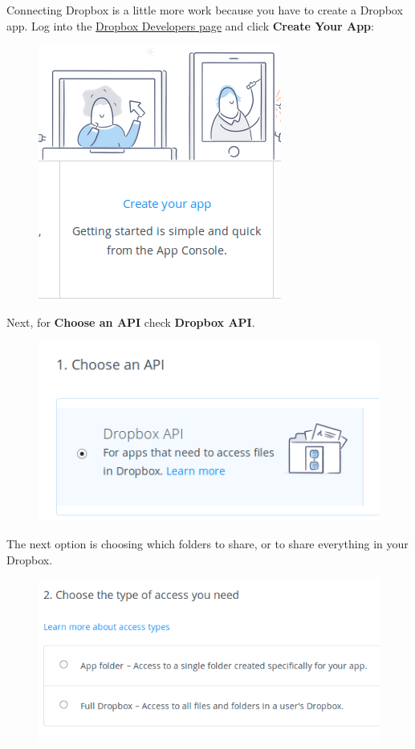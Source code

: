 \documentclass[letterpaper,10pt,english]{sphinxmanual}
\begin{document}
Connecting Dropbox is a little more work because you have to create a Dropbox
app. Log into the \href{http://www.dropbox.com/developers}{Dropbox Developers page}
and click \textbf{Create Your App}:
\begin{figure}[htbp]
\centering

\includegraphics{dropbox.png}
\end{figure}

Next, for \textbf{Choose an API} check \textbf{Dropbox API}.
\begin{figure}[htbp]
\centering

\includegraphics{dropbox-1.png}
\end{figure}

The next option is choosing which folders to share, or to share everything in
your Dropbox.
\begin{figure}[htbp]
\centering

\includegraphics{dropbox-2.png}
\end{figure}
\end{document}
